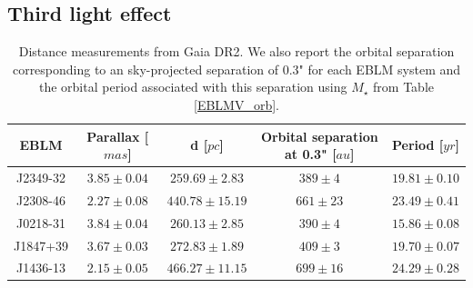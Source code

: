 

\subsection{Third light effect}\label{third_light_effect}



\begin{table}
\caption{Distance measurements from Gaia DR2. We also report the orbital separation corresponding to an sky-projected separation of 0.3" for each EBLM system and the orbital period associated with this separation using $M_{\star}$ from Table \ref{EBLMV_orb}.}              %
\label{EBLM_seperation}      %
\centering                                      %
\begin{tabular}{c c c c c}          %
\hline\hline                        %
EBLM & Parallax [$mas$] & d [$pc$] & Orbital separation at 0.3" [$au$] & Period  [$yr$] \\    %
\hline                                   %
    J2349-32 & $3.85 \pm 0.04$ & $259.69 \pm 2.83$   & $389 \pm 4$    &  $19.81 \pm 0.10$ \\      
    J2308-46 & $2.27 \pm 0.08$ & $440.78 \pm 15.19$  & $661 \pm 23$   &  $23.49 \pm 0.41$ \\
    J0218-31 & $3.84 \pm 0.04$ & $260.13 \pm 2.85$   & $390 \pm 4$    &  $15.86 \pm 0.08$ \\
    J1847+39 & $3.67 \pm 0.03$ & $272.83 \pm 1.89$   & $409 \pm 3$    &  $19.70 \pm 0.07$ \\
    J1436-13 & $2.15 \pm 0.05$ & $466.27 \pm 11.15$  & $699 \pm 16$   &  $24.29 \pm 0.28$ \\
\hline                                             %
\end{tabular}
\end{table}

